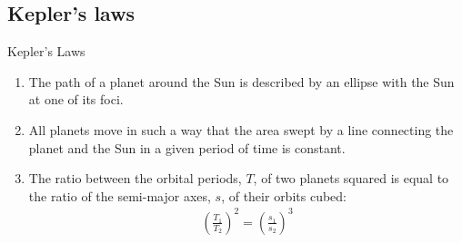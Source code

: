 \documentclass[aspectratio=169,
hyperref={colorlinks,urlcolor=blue}
]{beamer}
\begin{document}
\subsection{Kepler's laws}
\label{subsec:keplerslaws}
\begin{frame}{Kepler's Laws}
\begin{enumerate}
\item The path of a planet around the Sun is described by an ellipse with the Sun at one of its foci.
\item All planets move in such a way that the area swept by a line connecting the planet and the Sun in a given period of time is constant.
\item The ratio between the orbital periods, $T$, of two planets squared is equal to the ratio of the semi-major axes, $s$, of their orbits cubed:
\begin{align*}
\left( \frac{T_1}{T_2}\right)^2=\left( \frac{s_1}{s_2}\right)^3
\end{align*}
\end{enumerate}

\end{frame}



\end{document}
